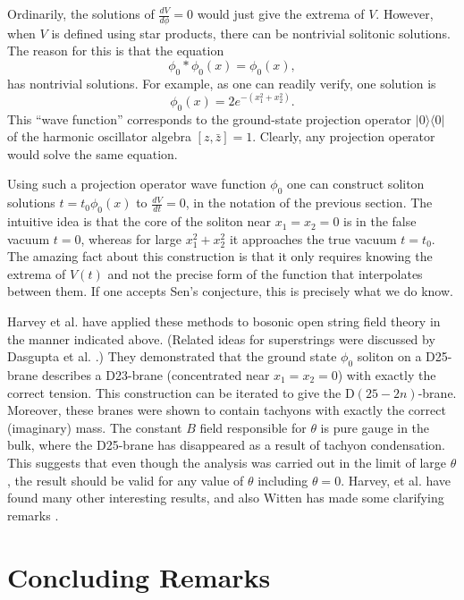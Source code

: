 \documentclass[a4paper,12pt]{article}
\begin{document}
Ordinarily, the solutions of $\frac{dV}{d\phi} = 0$ would just
give the extrema of $V$.  However, when $V$ is defined using star
products, there can be nontrivial solitonic solutions. The reason
for this is that the equation
\begin{equation}
\phi_0 * \phi_0 (x) = \phi_0 (x),
\end{equation}
has nontrivial solutions.  For example, as one can readily verify, one solution
is
\begin{equation}
\phi_0 (x) = 2e^{-(x_{1}^{2} + x_{2}^{2})}.
\end{equation}
This ``wave function'' corresponds to the ground-state projection operator
$|0\rangle\langle 0|$ of the harmonic oscillator algebra $[z, \bar z] = 1$.
Clearly, any projection operator would solve the same equation.

Using such a projection operator wave function $\phi_0$ one can
construct soliton solutions $t = t_0 \phi_0 (x)$ to $\frac{dV}{dt}
= 0$, in the notation of the previous section.  The intuitive idea
is that the core of the soliton near $x_1 = x_2 = 0$ is in the
false vacuum $t = 0$, whereas for large $x_1^2 + x_2^2$ it
approaches the true vacuum $t = t_0$.  The amazing fact about this
construction is that it only requires knowing the extrema of
$V(t)$ and not the precise form of the function that interpolates
between them.  If one accepts Sen's conjecture, this is precisely
what we do know.

Harvey et al. \cite {HKLM} have
applied these methods to bosonic open string field theory in the
manner indicated above. (Related ideas for superstrings were discussed by
Dasgupta et al. \cite{DMR}.)
They demonstrated that the ground state
$\phi_0$ soliton on a D25-brane describes a D23-brane
(concentrated near $x_1 = x_2 = 0$) with exactly the correct
tension.  This construction can be iterated to give the
D$(25-2n)$-brane. Moreover, these branes were shown to contain
tachyons with exactly the correct (imaginary) mass. The constant
$B$ field responsible for $\theta$ is pure gauge in the bulk,
where the D25-brane has disappeared as a result of tachyon
condensation.  This suggests that even though the analysis was
carried out in the limit of large $\theta$, the result should be
valid for any value of $\theta$ including $\theta = 0$.  
Harvey, et al. have found many other
interesting results, and also Witten has made some clarifying
remarks \cite{W4}.

\section{Concluding Remarks}
\end{document}
